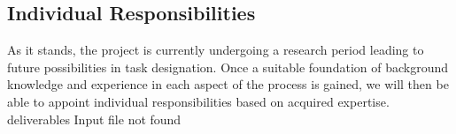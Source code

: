 \documentclass[letterpaper,12pt]{article}
\begin{document}
\subsection{Individual Responsibilities}
As it stands, the project is currently undergoing a research period leading to future possibilities in task designation. Once a suitable foundation of background knowledge and experience in each aspect of the process is gained, we will then be able to appoint individual responsibilities based on acquired expertise.
deliverables Input file not found 

\end{document}
